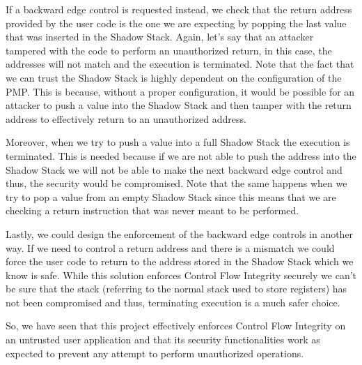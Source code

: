 If a backward edge control is requested instead, we check that the return address
provided by the user code is the one we are expecting by popping the last value that
was inserted in the Shadow Stack. Again, let's say that an attacker tampered with
the code to perform an unauthorized return, in this case, the addresses will not
match and the execution is terminated. Note that the fact that we can trust the
Shadow Stack is highly dependent on the configuration of the PMP. This is because,
without a proper configuration, it would be possible for an attacker to push a value
into the Shadow Stack and then tamper with the return address to effectively return
to an unauthorized address.

Moreover, when we try to push a value into a full Shadow Stack the execution is
terminated. This is needed because if we are not able to push the address into the
Shadow Stack we will not be able to make the next backward edge control and thus,
the security would be compromised. Note that the same happens when we try to pop
a value from an empty Shadow Stack since this means that we are checking a return
instruction that was never meant to be performed.

Lastly, we could design the enforcement of the backward edge controls in another
way. If we need to control a return address and there is a mismatch we could force
the user code to return to the address stored in the Shadow Stack which we know is
safe. While this solution enforces Control Flow Integrity securely we can't be
sure that the stack (referring to the normal stack used to store registers) has
not been compromised and thus, terminating execution is a much safer choice.

So, we have seen that this project effectively enforces Control Flow Integrity
on an untrusted user application and that its security functionalities work as
expected to prevent any attempt to perform unauthorized operations.